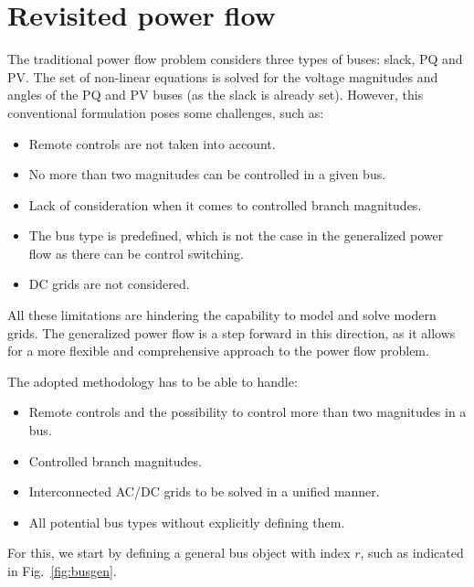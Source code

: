 \documentclass[11pt]{article}
\begin{document}
\newpage
\section{Revisited power flow}
The traditional power flow problem considers three types of buses: slack, PQ and PV. The set of non-linear equations is solved for the voltage magnitudes and angles of the PQ and PV buses (as the slack is already set). However, this conventional formulation poses some challenges, such as:
\begin{itemize}
	\item Remote controls are not taken into account.
	\item No more than two magnitudes can be controlled in a given bus.
	\item Lack of consideration when it comes to controlled branch magnitudes.
	\item The bus type is predefined, which is not the case in the generalized power flow as there can be control switching.
	\item DC grids are not considered.
\end{itemize}
All these limitations are hindering the capability to model and solve modern grids. The generalized power flow is a step forward in this direction, as it allows for a more flexible and comprehensive approach to the power flow problem.

The adopted methodology has to be able to handle:
\begin{itemize}
	\item Remote controls and the possibility to control more than two magnitudes in a bus.
	\item Controlled branch magnitudes.
	\item Interconnected AC/DC grids to be solved in a unified manner.
	\item All potential bus types without explicitly defining them.
\end{itemize}
For this, we start by defining a general bus object with index $r$, such as indicated in Fig.~\ref{fig:busgen}.
\end{document}
